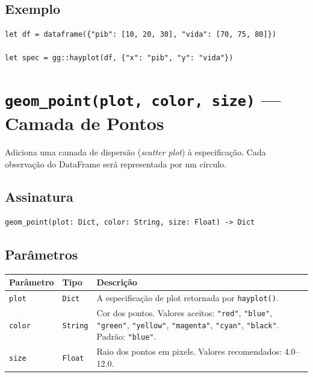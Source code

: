 \documentclass[12pt, a4paper, oneside]{book}
\newcommand{\code}[1]{\texttt{#1}}
\begin{document}
\subsection*{Exemplo}

\begin{lstlisting}[caption={Criando a especificação inicial}]
let df = dataframe({"pib": [10, 20, 30], "vida": [70, 75, 80]})

let spec = gg::hayplot(df, {"x": "pib", "y": "vida"})
\end{lstlisting}

\section{\texttt{geom\_point(plot, color, size)} --- Camada de Pontos}

Adiciona uma camada de dispersão (\textit{scatter plot}) à especificação.
Cada observação do DataFrame será representada por um círculo.

\subsection*{Assinatura}

\begin{lstlisting}[style=inline]
geom_point(plot: Dict, color: String, size: Float) -> Dict
\end{lstlisting}

\subsection*{Parâmetros}

\begin{tabularx}{\textwidth}{@{}lL{2.5cm}X@{}}
  \toprule
  \textbf{Parâmetro} & \textbf{Tipo} & \textbf{Descrição} \\
  \midrule
  \code{plot}  & \code{Dict}   & A especificação de plot retornada por \code{hayplot()}. \\[4pt]
  \code{color} & \code{String} & Cor dos pontos. Valores aceitos: \code{"red"}, \code{"blue"},
                                 \code{"green"}, \code{"yellow"}, \code{"magenta"},
                                 \code{"cyan"}, \code{"black"}. Padrão: \code{"blue"}. \\[4pt]
  \code{size}  & \code{Float}  & Raio dos pontos em pixels. Valores recomendados: 4.0--12.0. \\
  \bottomrule
\end{tabularx}
\end{document}
